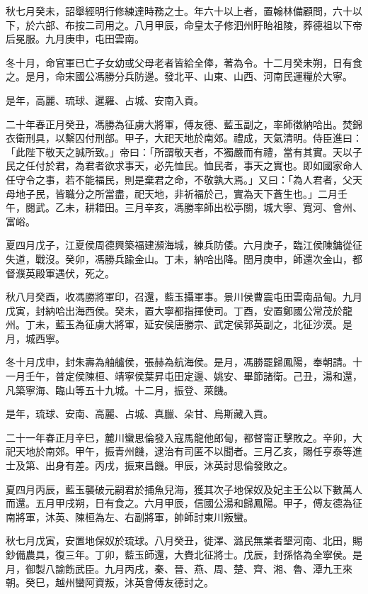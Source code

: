 \begin{pinyinscope}
秋七月癸未，詔舉經明行修練達時務之士。年六十以上者，置翰林備顧問，六十以下，於六部、布按二司用之。八月甲辰，命皇太子修泗州盱眙祖陵，葬德祖以下帝后冕服。九月庚申，屯田雲南。

冬十月，命官軍已亡子女幼或父母老者皆給全俸，著為令。十二月癸未朔，日有食之。是月，命宋國公馮勝分兵防邊。發北平、山東、山西、河南民運糧於大寧。

是年，高麗、琉球、暹羅、占城、安南入貢。

二十年春正月癸丑，馮勝為征虜大將軍，傅友德、藍玉副之，率師徵納哈出。焚錦衣衛刑具，以繫囚付刑部。甲子，大祀天地於南郊。禮成，天氣清明。侍臣進曰：「此陛下敬天之誠所致。」帝曰：「所謂敬天者，不獨嚴而有禮，當有其實。天以子民之任付於君，為君者欲求事天，必先恤民。恤民者，事天之實也。即如國家命人任守令之事，若不能福民，則是棄君之命，不敬孰大焉。」又曰：「為人君者，父天母地子民，皆職分之所當盡，祀天地，非祈福於己，實為天下蒼生也。」二月壬午，閱武。乙未，耕耤田。三月辛亥，馮勝率師出松亭關，城大寧、寬河、會州、富峪。

夏四月戊子，江夏侯周德興築福建瀕海城，練兵防倭。六月庚子，臨江侯陳鏞從征失道，戰沒。癸卯，馮勝兵踰金山。丁未，納哈出降。閏月庚申，師還次金山，都督濮英殿軍遇伏，死之。

秋八月癸酉，收馮勝將軍印，召還，藍玉攝軍事。景川侯曹震屯田雲南品甸。九月戊寅，封納哈出海西侯。癸未，置大寧都指揮使司。丁酉，安置鄭國公常茂於龍州。丁未，藍玉為征虜大將軍，延安侯唐勝宗、武定侯郭英副之，北征沙漠。是月，城西寧。

冬十月戊申，封朱壽為舳艫侯，張赫為航海侯。是月，馮勝罷歸鳳陽，奉朝請。十一月壬午，普定侯陳桓、靖寧侯葉昇屯田定邊、姚安、畢節諸衛。己丑，湯和還，凡築寧海、臨山等五十九城。十二月，振登、萊饑。

是年，琉球、安南、高麗、占城、真臘、朵甘、烏斯藏入貢。

二十一年春正月辛巳，麓川蠻思倫發入寇馬龍他郎甸，都督甯正擊敗之。辛卯，大祀天地於南郊。甲午，振青州饑，逮治有司匿不以聞者。三月乙亥，賜任亨泰等進士及第、出身有差。丙戌，振東昌饑。甲辰，沐英討思倫發敗之。

夏四月丙辰，藍玉襲破元嗣君於捕魚兒海，獲其次子地保奴及妃主王公以下數萬人而還。五月甲戌朔，日有食之。六月甲辰，信國公湯和歸鳳陽。甲子，傅友德為征南將軍，沐英、陳桓為左、右副將軍，帥師討東川叛蠻。

秋七月戊寅，安置地保奴於琉球。八月癸丑，徙澤、潞民無業者墾河南、北田，賜鈔備農具，復三年。丁卯，藍玉師還，大賚北征將士。戊辰，封孫恪為全寧侯。是月，御製八諭飭武臣。九月丙戌，秦、晉、燕、周、楚、齊、湘、魯、潭九王來朝。癸巳，越州蠻阿資叛，沐英會傅友德討之。


\end{pinyinscope}
